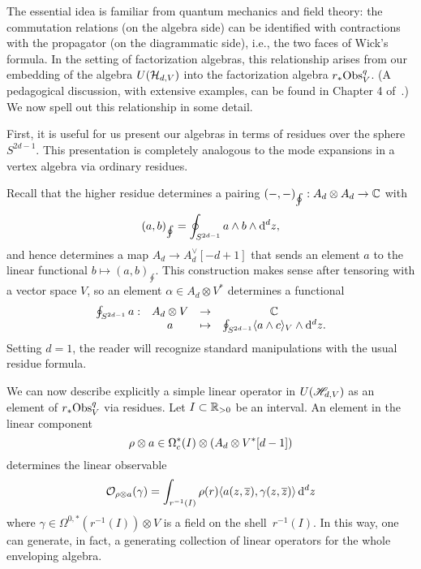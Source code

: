 
The essential idea is familiar from quantum mechanics and field theory:
the commutation relations (on the algebra side) can be identified with contractions with the propagator (on the diagrammatic side),
i.e., the two faces of Wick's formula.
In the setting of factorization algebras,
this relationship arises from our embedding of the algebra $U(\mathcal H_{d,V})$ into the factorization algebra $r_* {\rm Obs}^q_V$.
(A pedagogical discussion, with extensive examples, can be found in Chapter 4 of~\cite{CG1}.)
We now spell out this relationship in some detail.

First, it is useful for us present our algebras in terms of residues over the sphere $S^{2d-1}$. 
This presentation is completely analogous to the mode expansions in a vertex algebra via ordinary residues.

Recall that the higher residue determines a pairing $(-,-)_{\oint}: A_d \otimes A_d \to   \mathbb C$ with
\[
(a, b)_{\oint} = \oint_{S^{2d-1}} a \wedge b \wedge {\rm d}^d z ,
\]
and hence determines a map $A_d \to A_d^\vee [-d + 1]$ that sends an element $a$ to the linear functional $b \mapsto (a, b)_{\oint}$.
This construction makes sense after tensoring with a vector space $V$,
so an element $\alpha \in A_d \otimes V^*$ determines a functional 
\[
\begin{array}{cccc}
\oint_{S^{2d-1}} a  : & A_d \otimes V & \to & \mathbb C \\
& a & \mapsto & \oint_{S^{2d-1}} \langle a \wedge c\rangle_V \wedge {\rm d}^d z .
\end{array}
\]
Setting $d=1$, the reader will recognize standard manipulations with the usual residue formula.

We can now describe explicitly a simple linear operator in $U(\mathscr H_{d,V})$ as an element of $r_* {\rm Obs}^q_V$ via residues.   
Let $I \subset \mathbb R_{>0}$ be an interval. 
An element in the linear component 
\[
\rho \otimes a \in \Omega^*_c(I) \otimes \left(A_d \otimes V^*[d-1]\right)
\] 
determines the linear observable 
\[
\mathcal O_{\rho \otimes a}(\gamma) = \int_{r^{-1}(I)} \rho(r) \langle a(z,\overline{z}), \gamma(z,\overline{z})\rangle \,{\rm d}^d z 
\] 
where $\gamma \in \Omega^{0,*}(r^{-1}(I)) \otimes V$ is a field on the shell~$r^{-1}(I)$.
In this way, one can generate, in fact, a generating collection of linear operators for the whole enveloping algebra.

